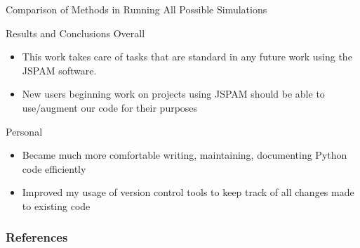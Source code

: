 \documentclass{beamer}
\newcommand{\newsection}[1]{
    \section{#1}
}
\begin{document}
\begin{frame}{Comparison of Methods in Running All Possible Simulations}
\begin{figure}[H]
\begin{minipage}{0.5\textwidth}
    \end{minipage}
\end{figure}

\end{frame}



\begin{frame}{Results and Conclusions}
    Overall
    \begin{itemize}
        \item This work takes care of tasks that are standard in any
            future work using the JSPAM software.
        \item New users beginning work on projects using JSPAM should be able to
            use/augment our code for their purposes
    \end{itemize}

    Personal
    \begin{itemize}
        \item Became much more comfortable writing, maintaining, documenting
            Python code efficiently
        \item Improved my usage of version control tools to keep track of all
            changes made to existing code
    \end{itemize}
\end{frame}

\begin{frame}[t,allowframebreaks]
    \frametitle{References}
    
\end{frame}
\end{document}
